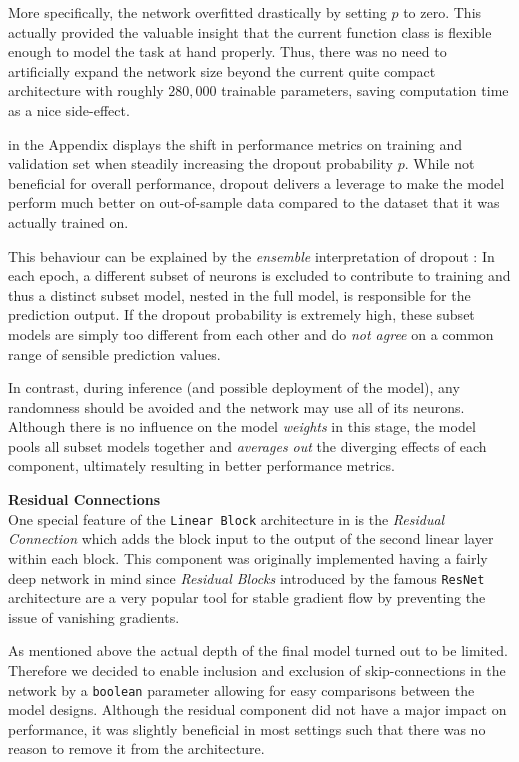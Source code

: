 More specifically, the network overfitted drastically by setting $p$ to zero.
This actually provided the valuable insight that the current function class is flexible enough to model the task at hand properly.
Thus, there was no need to artificially expand the network size beyond the current quite compact architecture with roughly $280,000$ trainable parameters, saving computation time as a nice side-effect.

 in the Appendix displays the shift in performance metrics on training and validation set when steadily increasing the dropout probability $p$.
While not beneficial for overall performance, dropout delivers a leverage to make the model perform much better on out-of-sample data compared to the dataset that it was actually trained on.

This behaviour can be explained by the \emph{ensemble} interpretation of dropout \citep{goodfellow2016}:
In each epoch, a different subset of neurons is excluded to contribute to training and thus a distinct subset model, nested in the full model, is responsible for the prediction output.
If the dropout probability is extremely high, these subset models are simply too different from each other and do \emph{not agree} on a common range of sensible prediction values.

In contrast, during inference (and possible deployment of the model), any randomness should be avoided and the network may use all of its neurons.
Although there is no influence on the model \emph{weights} in this stage, the model pools all subset models together and \emph{averages out} the diverging effects of each component, ultimately resulting in better performance metrics.

\textbf{Residual Connections} \\
One special feature of the \texttt{Linear Block} architecture in  is the \emph{Residual Connection} which adds the block input to the output of the second linear layer within each block.
This component was originally implemented having a fairly deep network in mind since \emph{Residual Blocks} introduced by the famous \texttt{ResNet} architecture \citep{he2015} are a very popular tool for stable gradient flow by preventing the issue of vanishing gradients.

As mentioned above the actual depth of the final model turned out to be limited.
Therefore we decided to enable inclusion and exclusion of skip-connections in the network by a \texttt{boolean} parameter allowing for easy comparisons between the model designs.
Although the residual component did not have a major impact on performance, it was slightly beneficial in most settings such that there was no reason to remove it from the architecture.

